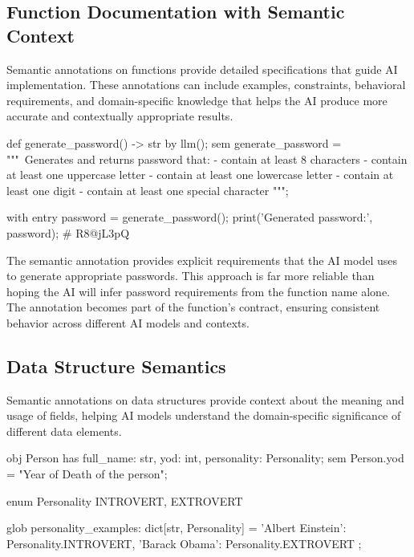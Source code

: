 \subsection{Function Documentation with Semantic Context}

Semantic annotations on functions provide detailed specifications that guide AI implementation. These annotations can include examples, constraints, behavioral requirements, and domain-specific knowledge that helps the AI produce more accurate and contextually appropriate results.

\begin{jacblock}
def generate_password() -> str by llm();
sem generate_password = """\
Generates and returns password that:
    - contain at least 8 characters
    - contain at least one uppercase letter
    - contain at least one lowercase letter
    - contain at least one digit
    - contain at least one special character
""";

with entry {
    password = generate_password();
    print('Generated password:', password);  # R8@jL3pQ
}
\end{jacblock}

The semantic annotation provides explicit requirements that the AI model uses to generate appropriate passwords. This approach is far more reliable than hoping the AI will infer password requirements from the function name alone. The annotation becomes part of the function's contract, ensuring consistent behavior across different AI models and contexts.

\subsection{Data Structure Semantics}

Semantic annotations on data structures provide context about the meaning and usage of fields, helping AI models understand the domain-specific significance of different data elements.

\begin{jacblock}
obj Person {
    has full_name: str,
        yod: int,
        personality: Personality;
}
sem Person.yod = "Year of Death of the person";

enum Personality { INTROVERT, EXTROVERT }

glob personality_examples: dict[str, Personality] = {
    'Albert Einstein': Personality.INTROVERT,
    'Barack Obama': Personality.EXTROVERT
};
\end{jacblock}

